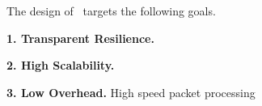 

The design of \nfactor~targets the following goals. 

{\bf 1. Transparent Resilience.} 

{\bf 2. High Scalability.}

{\bf 3. Low Overhead.} High speed packet processing
 